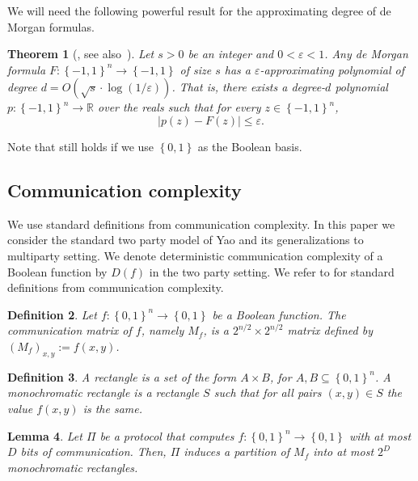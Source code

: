 \documentclass[10pt,a4paper]{article}
\newtheorem{theorem}{Theorem}
\newtheorem{definition}[theorem]{Definition}
\newtheorem{lemma}[theorem]{Lemma}
\let\citep\cite
\newcommand{\bool}{\left\{0,1\right\}}
\newcommand{\boolpm}{\left\{-1,1\right\}}
\newcommand{\real}{\mathbb{R}}
\newcommand{\prn}[1]{\left(#1\right)}
\begin{document}
    We will need the following powerful result for the approximating degree of de Morgan formulas.
    
    \begin{theorem}[\cite{Rei11b}, see also~\cite{ BNRdW07}]\label{thm:approx-polynomial}
		Let $s>0$ be an integer and $0<\varepsilon<1$. Any de Morgan formula $F\colon\boolpm^n\to\boolpm$ of size $s$ has a $\varepsilon$-approximating polynomial of degree $d=O(\sqrt{s}\cdot\log(1/\varepsilon))$. That is, there exists a degree-$d$ polynomial $p\colon\boolpm^n\to\real$ over the reals such that for every $z\in\boolpm^n$,
		\[
			\left| p(z)-F(z)\right| \leq \varepsilon.
		\]
	\end{theorem}
	
	Note that  still holds if we use $\bool$ as the Boolean basis.
    
	\subsection{Communication complexity}
	
	We use standard definitions from communication complexity. In this paper we consider the standard two party model of Yao and its generalizations to multiparty setting. We denote deterministic communication complexity of a Boolean function by $D(f)$ in the two party setting. We refer to \citep{Kushilevitz-Nisan97} for 
	standard definitions from communication complexity.
	
%
%
	    
%
%
	
%
	
	\begin{definition}
	    Let $f\colon\bool^{n}\to\bool$ be a Boolean function. The \emph{communication matrix of $f$}, namely $M_f$, is a $2^{n/2}\times2^{n/2}$ matrix defined by $\prn{M_f}_{x,y}:=f(x,y)$.
	\end{definition}
	
	\begin{definition}
	    A \emph{rectangle} is a set of the form $A\times B$, for $A,B\subseteq\bool^n$. A \emph{monochromatic rectangle} is a rectangle $S$ such that for all pairs $(x,y)\in S$ the value $f(x,y)$ is the same.
    \end{definition}
	
	\begin{lemma}
	    Let $\Pi$ be a protocol that computes $f\colon\bool^{n}\to\bool$ with at most $D$ bits of communication. Then, $\Pi$ induces a partition of $M_f$ into at most $2^D$ monochromatic rectangles.
	\end{lemma}
	
\end{document}
